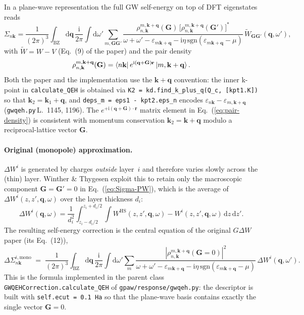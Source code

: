 \documentclass[11pt,a4paper]{article}
\newcommand{\rr}{\mathbf{r}}
\newcommand{\qq}{\mathbf{q}}
\newcommand{\GG}{\mathbf{G}}
\newcommand{\kk}{\mathbf{k}}
\newcommand{\dd}{\mathrm{d}}
\newcommand{\im}{\mathrm{i}}
\newcommand{\Heter}{\text{HS}}
\newcommand{\sgn}{\mathrm{sgn}}
\newcommand{\eps}{\varepsilon}
\newcommand{\eq}[1]{Eq.~(\ref{eq:#1})}
\begin{document}
In a plane-wave representation the full GW self-energy on top of
DFT eigenstates reads
\begin{equation}
\Sigma_{n\kk}=\frac{1}{(2\pi)^3}\!\int_\text{BZ}\!\dd\qq\,
\frac{\im}{2\pi}\!\int\dd\omega'\sum_{m,\GG\GG'}
\frac{\rho^{m,\kk+\qq}_{n,\kk}(\GG)\,
      \bigl[\rho^{m,\kk+\qq}_{n,\kk}(\GG')\bigr]^{*}}
     {\omega+\omega'-\eps_{m\kk+\qq}-\im\eta\,\sgn(\eps_{m\kk+\qq}-\mu)}
\,\widetilde W_{\GG\GG'}(\qq,\omega'),
\label{eq:Sigma-PW}
\end{equation}
with $\widetilde W = W - V$ (Eq.~(9) of the paper) and the pair density
\begin{equation}
\rho^{m,\kk+\qq}_{n,\kk}(\GG) =
   \braket{n\kk | \, e^{\im (\qq+\GG)\!\cdot\!\rr}\,| m,\kk+\qq}.
\label{eq:pair-density}
\end{equation}
Both the paper and the implementation use the $\kk+\qq$ convention:
the inner k-point in \texttt{calculate\_QEH} is obtained via
\texttt{K2 = kd.find\_k\_plus\_q(Q\_c, [kpt1.K])} so that
$\kk_2 = \kk_1+\qq$, and \texttt{deps\_m = eps1 - kpt2.eps\_n} encodes
$\eps_{n\kk}-\eps_{m,\kk+\qq}$ (\texttt{gwqeh.py}\,L.~1145, 1196).
The $e^{+\im(\qq+\GG)\cdot\rr}$ matrix element in \eq{pair-density}
is consistent with momentum conservation $\kk_2 = \kk+\qq$ modulo a
reciprocal-lattice vector $\GG$.

\paragraph{Original (monopole) approximation.}
$\Delta W^i$ is generated by charges \emph{outside} layer~$i$ and
therefore varies slowly across the (thin) layer.  Winther \& Thygesen
exploit this to retain only the macroscopic component
$\GG=\GG'=0$ in \eq{Sigma-PW}, which is the average of
$\Delta W^i(z,z',\qq,\omega)$ over the layer thickness $d_i$:
\begin{equation}
\Delta W^i(\qq,\omega) =
\frac{1}{d_i^2}\int_{z_i-d_i/2}^{z_i+d_i/2}\!\!\!\!\int
W^{\Heter}(z,z',\qq,\omega) - W^i(z,z',\qq,\omega)\,\dd z\,\dd z'.
\label{eq:dW-monopole}
\end{equation}
The resulting self-energy correction is the central equation of the
original $G\Delta W$ paper (its Eq.~(12)),
\begin{equation}
\Delta\Sigma_{n\kk}^{i,\text{mono}}\;=\;
\frac{1}{(2\pi)^3}\!\int_\text{BZ}\!\!\dd\qq\,
\frac{\im}{2\pi}\!\int\dd\omega'\sum_{m}
\frac{|\rho^{m,\kk+\qq}_{n,\kk}(\GG=0)|^{2}}
     {\omega+\omega'-\eps_{m\kk+\qq}-\im\eta\,\sgn(\eps_{m\kk+\qq}-\mu)}
\,\Delta W^i(\qq,\omega').
\label{eq:Sigma-monopole}
\end{equation}
This is the formula implemented in the parent class
\texttt{GWQEHCorrection.calculate\_QEH} of
\texttt{gpaw/response/gwqeh.py}: the descriptor is built with
\texttt{self.ecut = 0.1\,Ha} so that the plane-wave basis contains
exactly the single vector $\GG=0$.
\end{document}
